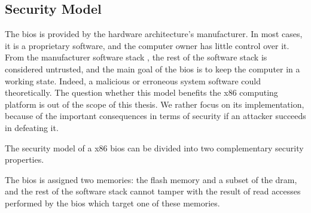 \subsection{Security Model}
\label{subsec:usecase:firm:sec}

The \ac{bios} is provided by the hardware architecture’s manufacturer.
%
In most cases, it is a proprietary software, and the computer owner has little
control over it.
%
From the manufacturer software stack , the rest of the software stack
is considered untrusted, and the main goal of the \ac{bios} is to keep the
computer in a working state.
%
Indeed, a malicious or erroneous system software could
theoretically. 
%
The question whether this model benefits the x86 computing platform is out of
the scope of this thesis. 
%
We rather focus on its implementation, because of the important consequences in
terms of security if an attacker succeeds in defeating it.
%

The security model of a x86 \ac{bios} can be divided into two complementary
security properties.
%

\begin{definition}
  \label{def:usecase:biosint}
  The \ac{bios} is assigned two memories: the flash memory and a subset of the
  \ac{dram}, and the rest of the software stack cannot tamper with the result of
  read accesses performed by the \ac{bios} which target one of these memories.
\end{definition}

